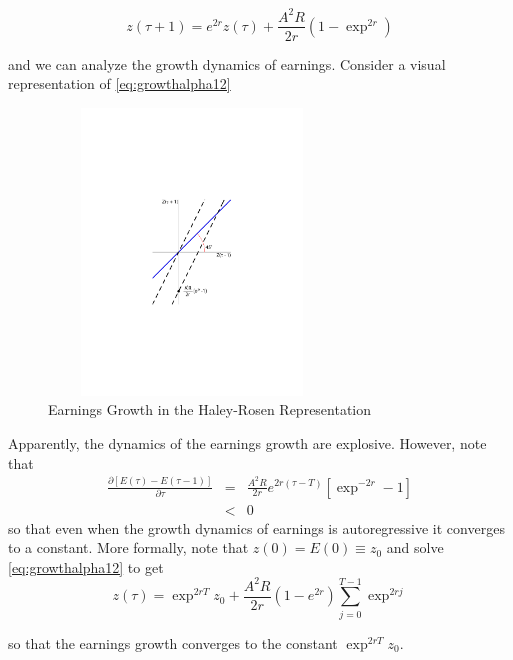 \begin{equation}
z(\tau + 1) = e^{2r} z(\tau) + \frac{A^2 R}{2r} \left( 1 - \exp^{2r} \right) \label{eq:growthalpha12}
\end{equation}

\noindent and we can analyze the growth dynamics of earnings. Consider a visual representation of \eqref{eq:growthalpha12}

\begin{center}
\begin{figure}[H]
\caption{Earnings Growth in the Haley-Rosen Representation}
\centering
\includegraphics[width=3in, height=3in]{Figures/fig-explode-converge.pdf}
\end{figure}
\end{center}

\indent Apparently, the dynamics of the earnings growth are explosive. However, note that
\begin{eqnarray}
\frac{\partial \left[ E(\tau) - E(\tau - 1) \right] }{\partial \tau} &=& \frac{A^2 R}{2r} e^{2r(\tau - T)} \left[ \exp^{-2r} - 1 \right] \nonumber \\
&<& 0
\end{eqnarray}
so that even when the growth dynamics of earnings is autoregressive it converges to a constant. More formally, note that $z(0) = E(0) \equiv z_{0}$ and solve \eqref{eq:growthalpha12} to get
\begin{equation}
z(\tau) = \exp^{2rT} z_{0} + \frac{A^2 R}{2r} \left( 1 - e^{2r} \right) \sum \limits _{j=0} ^{T-1} \exp^{2rj}
\end{equation}

\noindent so that the earnings growth converges to the constant $\exp^{2rT} z_{0}$.\\

